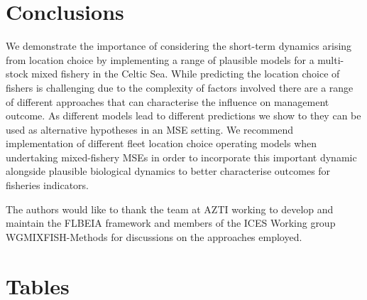 \documentclass[12pt, halfline, a4paper]{ouparticle}
\begin{document}
\section{Conclusions} \label{con}

We demonstrate the importance of considering the short-term dynamics arising
from location choice by implementing a range of plausible models for a
multi-stock mixed fishery in the Celtic Sea. While predicting the location
choice of fishers is challenging due to the complexity of factors involved
there are a range of different approaches that can characterise the influence
on management outcome. As different models lead to different predictions we
show to they can be used as alternative hypotheses in an MSE setting. We
recommend implementation of different fleet location choice operating models
when undertaking mixed-fishery MSEs in order to incorporate this important
dynamic alongside plausible biological dynamics to better characterise outcomes
for fisheries indicators. 

\begin{notes}[Acknowledgements] The authors would like to thank the team at
	AZTI working to develop and
maintain the FLBEIA framework and members of the ICES Working group
WGMIXFISH-Methods for discussions on the approaches employed.
\end{notes}




\clearpage

\section{Tables}
\end{document}

